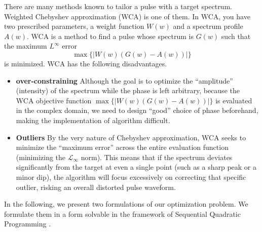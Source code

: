 There are many methods known to tailor a pulse with a target spectrum.
Weighted Chebyshev approximation (WCA) \cite{Ding2025} is one of them.
In WCA, you have two prescribed parameters, a weight function $W(w)$ and a spectrum profile
$A(w)$. WCA is a method to find a pulse whose spectrum is $G(w)$ such that the maximum $L^\infty$ error
$$
  \max\{|W(w)(G(w)-A(w))|\}
$$
is minimized.
WCA has the following disadvantages.
\begin{itemize}
  \item \textbf{over-constraining}
        Although the  goal is to optimize the ``amplitude'' (intensity) of the spectrum while the phase is left
        arbitrary, because the WCA objective function $\max\{\vert{}W(w)(G(w) - A(w))\vert{}\}$ is
        evaluated in the complex domain, we need to design ``good'' choice of phase beforehand, making the implementation
        of algorithm difficult.

  \item\textbf{Outliers}
        By the very nature of Chebyshev approximation, WCA seeks to minimize the ``maximum error'' across the entire
        evaluation function (minimizing the $\mathcal{L}_\infty$ norm). This means that if the spectrum deviates
        significantly from the target at even a single point (such as a sharp peak or a minor dip), the algorithm will
        focus excessively on correcting that specific outlier, risking an overall distorted pulse waveform.
\end{itemize}

In the following, we present two formulations of our optimization problem.
We formulate them in a form solvable in the framework of Sequential Quadratic Programming \cite{powell1978fast}.

%
%
